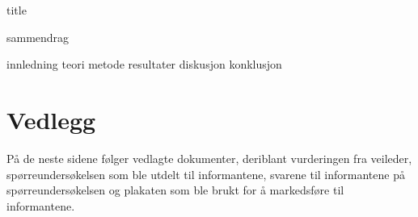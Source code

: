 



{title}
\newpage
\myemptypage

\cleardoublepage
\tableofcontents
\newpage

{sammendrag}
\myemptypage


{innledning}
{teori}
{metode}
{resultater}
{diskusjon}
{konklusjon}

\newpage

\printbibliography[heading=bibintoc]
\newpage

\listoffigures

\section*{Vedlegg}\label{vedlegg}
På de neste sidene følger vedlagte dokumenter, deriblant vurderingen fra veileder, spørreundersøkelsen som ble utdelt til informantene, svarene til informantene på spørreundersøkelsen og plakaten som ble brukt for å markedsføre til informantene.
\newpage
\myemptypage
\myemptypage

{}

{}

{}


\myemptypage

{}





